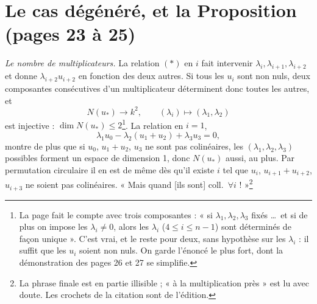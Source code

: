 \documentclass[11pt,a4paper]{article}
\begin{document}
\section*{Le cas dégénéré, et la Proposition (pages 23 à 25)}

\emph{Le nombre de multiplicateurs.} La relation $(\ast)$ en $i$ fait intervenir
$\lambda_i, \lambda_{i+1}, \lambda_{i+2}$ et donne $\lambda_{i+2} u_{i+2}$ en
fonction des deux autres. Si tous les $u_i$ sont non nuls, deux composantes
consécutives d'un multiplicateur déterminent donc toutes les autres, et
\[
  N(u_*) \longrightarrow k^2, \qquad (\lambda_i) \longmapsto (\lambda_1, \lambda_2)
\]
est injective : $\dim N(u_*) \leqslant 2$\footnote{La page fait le compte avec
trois composantes : « si $\lambda_1, \lambda_2, \lambda_3$ fixés \ldots\ et si
de plus on impose les $\lambda_i \neq 0$, alors les $\lambda_i$
($4 \leqslant i \leqslant n-1$) sont déterminés de façon unique ». C'est vrai,
et le reste pour deux, sans hypothèse sur les $\lambda_i$ : il suffit que les
$u_i$ soient non nuls. On garde l'énoncé le plus fort, dont la démonstration
des pages 26 et 27 se simplifie.}. La relation en $i = 1$,
\[
  \lambda_1 u_0 - \lambda_2 (u_1 + u_2) + \lambda_3 u_3 = 0 ,
\]
montre de plus que si $u_0$, $u_1 + u_2$, $u_3$ ne sont pas colinéaires, les
$(\lambda_1, \lambda_2, \lambda_3)$ possibles forment un espace de dimension 1,
donc $N(u_*)$ aussi, au plus. Par permutation circulaire il en est de même dès
qu'il existe $i$ tel que $u_i$, $u_{i+1} + u_{i+2}$, $u_{i+3}$ ne soient pas
colinéaires. « Mais quand [ils sont] coll.\ $\forall i$ ! »\footnote{La phrase
finale est en partie illisible ; « à la multiplication près » est lu avec
doute. Les crochets de la citation sont de l'édition.}
\end{document}
